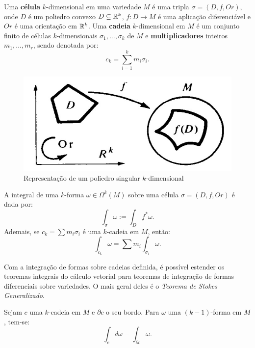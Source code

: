 \begin{definition}
    Uma \textbf{célula} $k$-dimensional em uma variedade $M$ é uma tripla $\sigma = (D, f, Or)$, onde $D$ é um poliedro convexo $D \subseteq \mathbb{R}^k$, $f: D \to M$ é uma aplicação diferenciável e $Or$ é uma orientação em $\mathbb{R}^k$. Uma \textbf{cadeia} $k$-dimensional em $M$ é um conjunto finito de células $k$-dimensionais $\sigma_1, ..., \sigma_k$ de $M$ e \textbf{multiplicadores} inteiros $m_1, ..., m_r$, sendo denotada por:
    \begin{equation*}
        c_k = \sum_{i=1}^k m_i \sigma_i.
    \end{equation*}
\end{definition}

\begin{figure}
    \centering
    \includegraphics[width=0.35\linewidth]{tcc//img/arnold_celula.jpg}
    \caption{Representação de um poliedro singular $k$-dimensional \citep[Figura 150, pg. 184]{Arnold2013-bs}}
\end{figure}

\begin{definition}
    A integral de uma $k$-forma $\omega \in \Omega^k (M)$ sobre uma célula $\sigma = (D, f, Or)$ é dada por:
    \begin{equation*}
        \int_\sigma \omega := \int_D f^* \omega.
    \end{equation*}
    Ademais, se $c_k = \sum m_i \sigma_i$ é uma $k$-cadeia em $M$, então:
    \begin{equation*}
        \int_{c_k} \omega = \sum m_i \int_{\sigma_i} \omega.
    \end{equation*}
\end{definition}

Com a integração de formas sobre cadeias definida, é possível estender os teoremas integrais do cálculo vetorial para teoremas de integração de formas diferenciais sobre variedades. O mais geral deles é o \textit{Teorema de Stokes Generalizado}.

\begin{theorem}\citep[192-193]{Arnold2013-bs}
    Sejam $c$ uma $k$-cadeia em $M$ e $\partial c$ o seu bordo. Para $\omega$ uma $(k-1)$-forma em $M$, tem-se:
    \begin{equation*}
        \int_c d \omega = \int_{\partial c} \omega.
    \end{equation*}
\end{theorem}

